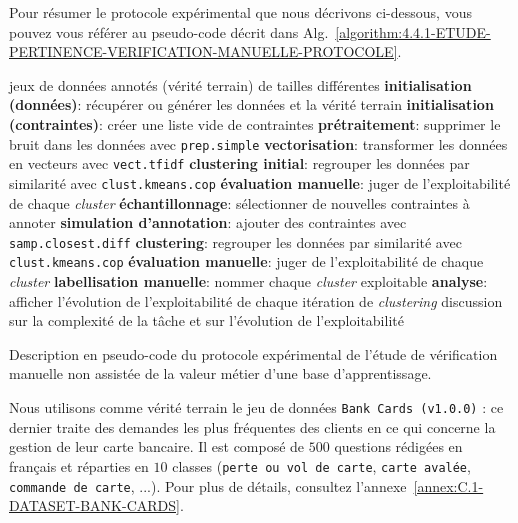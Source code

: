 			Pour résumer le protocole expérimental que nous décrivons ci-dessous, vous pouvez vous référer au pseudo-code décrit dans Alg.~\ref{algorithm:4.4.1-ETUDE-PERTINENCE-VERIFICATION-MANUELLE-PROTOCOLE}.
			\begin{algorithm}[!htb]
				\begin{algorithmic}[1]
					\Require jeux de données annotés (vérité terrain) de tailles différentes
					\State \textbf{initialisation (données)}: récupérer ou générer les données et la vérité terrain
					\State \textbf{initialisation (contraintes)}: créer une liste vide de contraintes
					\State \textbf{prétraitement}: supprimer le bruit dans les données avec \texttt{prep.simple}
					\State \textbf{vectorisation}: transformer les données en vecteurs avec \texttt{vect.tfidf}
					\State \textbf{clustering initial}: regrouper les données par similarité avec \texttt{clust.kmeans.cop}
					\State \textbf{évaluation manuelle}: juger de l'exploitabilité de chaque \textit{cluster}
					\Repeat
						\State \textbf{échantillonnage}: sélectionner de nouvelles contraintes à annoter
						\State \textbf{simulation d'annotation}: ajouter des contraintes avec \texttt{samp.closest.diff}
						\State \textbf{clustering}: regrouper les données par similarité avec \texttt{clust.kmeans.cop}
						\State \textbf{évaluation manuelle}: juger de l'exploitabilité de chaque \textit{cluster}
						\State \textbf{labellisation manuelle}: nommer chaque \textit{cluster} exploitable
					\State \textbf{analyse}: afficher l'évolution de l'exploitabilité de chaque itération de \textit{clustering}
					\Ensure discussion sur la complexité de la tâche et sur l'évolution de l'exploitabilité
				\end{algorithmic}
				\caption{Description en pseudo-code du protocole expérimental de l'étude de vérification manuelle non assistée de la valeur métier d'une base d'apprentissage.}
				\label{algorithm:4.4.1-ETUDE-PERTINENCE-VERIFICATION-MANUELLE-PROTOCOLE}
			\end{algorithm}
			
			Nous utilisons comme vérité terrain le jeu de données \texttt{Bank Cards (v1.0.0)} : ce dernier traite des demandes les plus fréquentes des clients en ce qui concerne la gestion de leur carte bancaire.
			Il est composé de $500$ questions rédigées en français et réparties en $10$ classes (\texttt{perte ou vol de carte}, \texttt{carte avalée}, \texttt{commande de carte}, ...).
			Pour plus de détails, consultez l'annexe~\ref{annex:C.1-DATASET-BANK-CARDS}.
			
